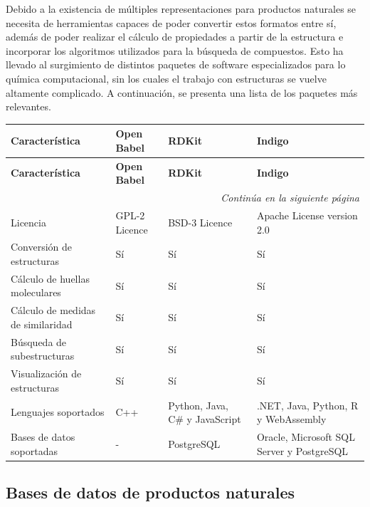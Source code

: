 Debido a la existencia de múltiples representaciones para productos naturales se necesita de herramientas capaces de poder convertir estos formatos entre sí, además de poder realizar el cálculo de propiedades a partir de la estructura e incorporar los algoritmos utilizados para la búsqueda de compuestos. Esto ha llevado al surgimiento de distintos paquetes de software especializados para lo química computacional, sin los cuales el trabajo con estructuras se vuelve altamente complicado. A continuación, se presenta una lista de los paquetes más relevantes.

\begin{longtable}{|p{4cm}|p{3cm}|p{3cm}|p{3cm}|}
    \hline
    \textbf{Característica} & \textbf{Open Babel} & \textbf{RDKit} & \textbf{Indigo} \\
    \hline
    \endfirsthead
    
    \hline
    \textbf{Característica} & \textbf{Open Babel} & \textbf{RDKit} & \textbf{Indigo} \\
    \hline
    \endhead
    
    \hline
    \multicolumn{4}{|r|}{\textit{Continúa en la siguiente página}} \\
    \endfoot
    
    \hline
    \endlastfoot
    
    Licencia & GPL-2 Licence & BSD-3 Licence & Apache License version 2.0 \\
    \hline
    Conversión de estructuras & Sí & Sí & Sí \\
    \hline
    Cálculo de huellas moleculares & Sí & Sí & Sí \\
    \hline
    Cálculo de medidas de similaridad & Sí & Sí & Sí \\
    \hline
    Búsqueda de subestructuras & Sí & Sí & Sí \\
    \hline
    Visualización de estructuras & Sí & Sí & Sí \\
    \hline
    Lenguajes soportados & C++ & Python, Java, C\# y JavaScript & .NET, Java, Python, R y WebAssembly \\
    \hline
    Bases de datos soportadas & - & PostgreSQL & Oracle, Microsoft SQL Server y PostgreSQL \\
    \hline
    
    \end{longtable}

\subsection{Bases de datos de productos naturales}
 

